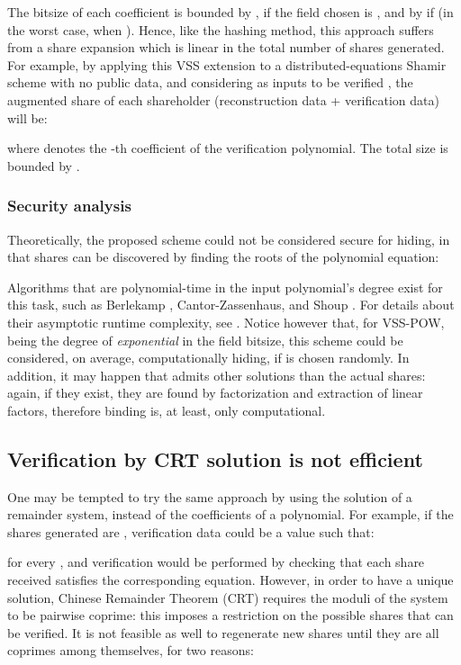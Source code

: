 \documentclass[10pt,journal,cspaper,compsoc]{IEEEtran}
\begin{document}
The bitsize of each coefficient is bounded by , if the field chosen is , and by  if  (in the worst case, when ).
Hence, like the hashing method, this approach suffers from a share expansion which is linear in the total number of shares generated. For example, by applying this VSS extension to a distributed-equations Shamir scheme with no public data, and considering as inputs to be verified , the augmented share of each shareholder (reconstruction data + verification data) will be:

where  denotes the -th coefficient of the verification polynomial. The total size is bounded by .

\subsubsection{Security analysis}
Theoretically, the proposed scheme could not be considered secure for hiding, in that shares can be discovered by finding the roots of the polynomial equation:

Algorithms that are polynomial-time in the input polynomial's degree exist for this task, such as Berlekamp \cite{Berlekamp:1967:FPF}, Cantor-Zassenhaus, and Shoup \cite{Shoup90onthe}. For details about their asymptotic runtime complexity, see \cite{Shoup93factoringpolynomials}.
Notice however that, for VSS-POW, being the degree of  \emph{exponential} in the field bitsize, this scheme could be considered, on average, computationally hiding, if  is chosen randomly.
In addition, it may happen that  admits other solutions than the actual shares: again, if they exist, they are found by factorization and extraction of linear factors, therefore binding is, at least, only computational.




\subsection{Verification by CRT solution is not efficient}
One may be tempted to try the same approach by using the solution of a remainder system, instead of the coefficients of a polynomial. For example, if the shares generated are , verification data could be a value  such that:



for every , and verification would be performed by checking that each share received satisfies the corresponding equation.
However, in order to have a unique solution, Chinese Remainder Theorem (CRT) requires the moduli of the system to be pairwise coprime: this imposes a restriction on the possible shares that can be verified.
It is not feasible as well to regenerate new shares until they are all coprimes among themselves, for two reasons:
\end{document}
